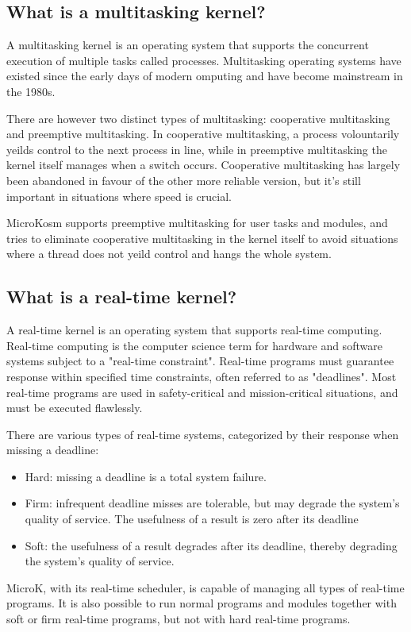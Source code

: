 \documentclass{report}
\begin{document}
\subsection{What is a multitasking kernel?}
A multitasking kernel is an operating system that supports the concurrent execution of multiple tasks called processes. Multitasking operating systems have existed since the early days of modern omputing and have become mainstream in the 1980s.

There are however two distinct types of multitasking: cooperative multitasking and preemptive multitasking. In cooperative multitasking, a process volountarily yeilds control to the next process in line, while in preemptive multitasking the kernel itself manages when a switch occurs. Cooperative multitasking has largely been abandoned in favour of the other more reliable version, but it's still important in situations where speed is crucial. 

MicroKosm supports preemptive multitasking for user tasks and modules, and tries to eliminate cooperative multitasking in the kernel itself to avoid situations where a thread does not yeild control and hangs the whole system.

\subsection{What is a real-time kernel?}
A real-time kernel is an operating system that supports real-time computing. Real-time computing is the computer science term for hardware and software systems subject to a "real-time constraint". Real-time programs must guarantee response within specified time constraints, often referred to as "deadlines". Most real-time programs are used in safety-critical and mission-critical situations, and must be executed flawlessly.

There are various types of real-time systems, categorized by their response when missing a deadline:
\begin{itemize}
	\item Hard: missing a deadline is a total system failure.
	\item Firm: infrequent deadline misses are tolerable, but may degrade the system's quality of service. The usefulness of a result is zero after its deadline
	\item Soft: the usefulness of a result degrades after its deadline, thereby degrading the system's quality of service.
 \end{itemize}
MicroK, with its real-time scheduler, is capable of managing all types of real-time programs. It is also possible to run normal programs and modules together with soft or firm real-time programs, but not with hard real-time programs.
\end{document}
